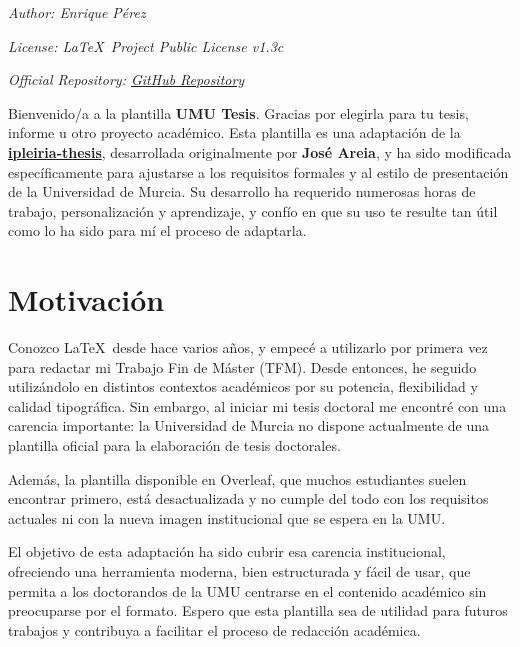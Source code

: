 
{
\parindent0pt

\textit{Author: Enrique Pérez}

\textit{License: \LaTeX~Project Public License v1.3c}

\textit{Official Repository: \href{https://github.com/joseareia/ipleiria-thesis}{GitHub Repository}}

Bienvenido/a a la plantilla \textcolor{maincolor}{\textbf{UMU Tesis}}. Gracias por elegirla para tu tesis, informe u otro proyecto académico. Esta plantilla es una adaptación de la \textbf{\href{https://github.com/joseareia/ipleiria-thesis}{ipleiria-thesis}}, desarrollada originalmente por \textbf{José Areia}, y ha sido modificada específicamente para ajustarse a los requisitos formales y al estilo de presentación de la Universidad de Murcia. Su desarrollo ha requerido numerosas horas de trabajo, personalización y aprendizaje, y confío en que su uso te resulte tan útil como lo ha sido para mí el proceso de adaptarla.

\section{Motivación}
Conozco \LaTeX~desde hace varios años, y empecé a utilizarlo por primera vez para redactar mi Trabajo Fin de Máster (TFM). Desde entonces, he seguido utilizándolo en distintos contextos académicos por su potencia, flexibilidad y calidad tipográfica. Sin embargo, al iniciar mi tesis doctoral me encontré con una carencia importante: la Universidad de Murcia no dispone actualmente de una plantilla oficial para la elaboración de tesis doctorales.

Además, la plantilla disponible en Overleaf, que muchos estudiantes suelen encontrar primero, está desactualizada y no cumple del todo con los requisitos actuales ni con la nueva imagen institucional que se espera en la UMU. 

El objetivo de esta adaptación ha sido cubrir esa carencia institucional, ofreciendo una herramienta moderna, bien estructurada y fácil de usar, que permita a los doctorandos de la UMU centrarse en el contenido académico sin preocuparse por el formato. Espero que esta plantilla sea de utilidad para futuros trabajos y contribuya a facilitar el proceso de redacción académica.

}
